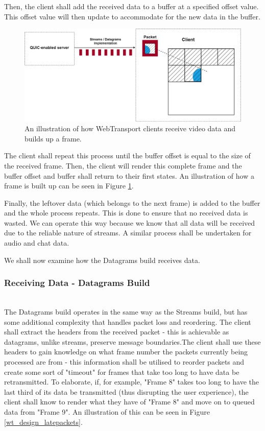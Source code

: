 Then, the client shall add the received data to a buffer at a specified offset value. This offset value will then update to accommodate for the new data in the buffer. 

\begin{figure}[h]
    \centering
    \includegraphics[width=1\linewidth]{images/receiving data.png}
	\caption{An illustration of how WebTransport clients receive video data and builds up a frame.}
    \label{wt_receive data}
\end{figure}


The client shall repeat this process until the buffer offset is equal to the size of the received frame. Then, the client will render this complete frame and the buffer offset and buffer shall return to their first states. An illustration of how a frame is built up can be seen in Figure \ref{wt_receive data}. 

Finally, the leftover data (which belongs to the next frame) is added to the buffer and the whole process repeats. This is done to ensure that no received data is wasted. We can operate this way because we know that all data will be received due to the reliable nature of streams. A similar process shall be undertaken for audio and chat data.


We shall now examine how the Datagrams build receives data.
\hfill\\
\subsubsection{Receiving Data - Datagrams Build}
\hfill\\
The Datagrams build operates in the same way as the Streams build, but has some additional complexity that handles packet loss and reordering.
The client shall extract the headers from the received packet - this is achievable as datagrams, unlike streams, preserve message boundaries.The client shall use these headers to gain knowledge on what frame number the packets currently being processed are from - this information shall be utilised to reorder packets and create some sort of "timeout" for frames that take too long to have data be retransmitted. To elaborate, if, for example, "Frame 8" takes too long to have the last third of its data be transmitted (thus disrupting the user experience), the client shall know to render what they have of "Frame 8" and move on to queued data from "Frame 9". An illustration of this can be seen in Figure \ref{wt_design_latepackets}.

